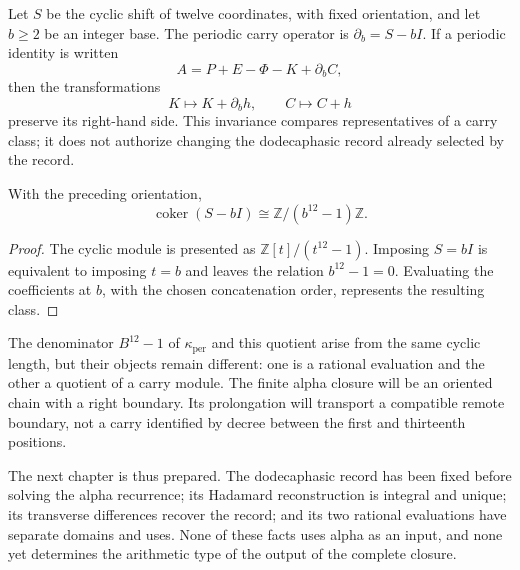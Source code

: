 Let \(S\) be the cyclic shift of twelve coordinates, with fixed
orientation, and let \(b\geq2\) be an integer base. The periodic
carry operator is \(\partial_b=S-bI\). If a periodic identity is written
\[
 A=P+E-\Phi-K+\partial_bC,
\]
then the transformations
\[
 K\longmapsto K+\partial_bh,\qquad C\longmapsto C+h
\]
preserve its right-hand side. This invariance compares representatives of a
carry class; it does not authorize changing the dodecaphasic record already
selected by the record.

\begin{proposition}
\label{prop:k-cociente-acarreo}
With the preceding orientation,
\[
 \operatorname{coker}(S-bI)\cong\mathbb Z/(b^{12}-1)\mathbb Z.
\]
\end{proposition}

\begin{proof}
The cyclic module is presented as
\(\mathbb Z[t]/(t^{12}-1)\). Imposing \(S=bI\) is equivalent to imposing
\(t=b\) and leaves the relation \(b^{12}-1=0\). Evaluating the
coefficients at \(b\), with the chosen concatenation order, represents
the resulting class.
\end{proof}

The denominator \(B^{12}-1\) of \(\kappa_{\mathrm{per}}\) and this
quotient arise from the same cyclic length, but their objects remain
different: one is a rational evaluation and the other a quotient
of a carry module. The finite alpha closure will be an oriented
chain with a right boundary. Its prolongation will transport a
compatible remote boundary, not a carry identified by decree
between the first and thirteenth positions.

The next chapter is thus prepared. The dodecaphasic record has been fixed before
solving the alpha recurrence; its Hadamard reconstruction is
integral and unique; its transverse differences recover the record; and
its two rational evaluations have separate domains and uses. None
of these facts uses alpha as an input, and none yet determines the
arithmetic type of the output of the complete closure.
